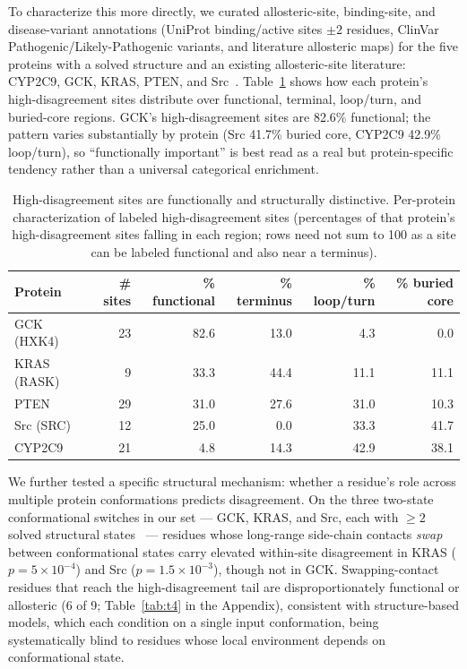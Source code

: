\documentclass{article}
\begin{document}
To characterize this more directly, we curated allosteric-site, binding-site, and disease-variant annotations (UniProt binding/active sites $\pm 2$ residues, ClinVar Pathogenic/Likely-Pathogenic variants, and literature allosteric maps) for the five proteins with a solved structure and an existing allosteric-site literature: CYP2C9, GCK, KRAS, PTEN, and Src~\citep{beltran_allosteric_2026,weng_energetic_2024,liu_insights_2012}. Table~\ref{tab:t1-main} shows how each protein's high-disagreement sites distribute over functional, terminal, loop/turn, and buried-core regions. GCK's high-disagreement sites are 82.6\% functional; the pattern varies substantially by protein (Src 41.7\% buried core, CYP2C9 42.9\% loop/turn), so ``functionally important'' is best read as a real but protein-specific tendency rather than a universal categorical enrichment.

\begin{table}[t]
  \caption{High-disagreement sites are functionally and structurally distinctive. Per-protein characterization of labeled high-disagreement sites (percentages of that protein's high-disagreement sites falling in each region; rows need not sum to 100 as a site can be labeled functional and also near a terminus).}
  \label{tab:t1-main}
  \centering
  \small
  \begin{tabular}{lrrrrr}
    \toprule
    Protein & \# sites & \% functional & \% terminus & \% loop/turn & \% buried core \\
    \midrule
    GCK (HXK4)   & 23 & 82.6 & 13.0 & 4.3  & 0.0  \\
    KRAS (RASK)  & 9  & 33.3 & 44.4 & 11.1 & 11.1 \\
    PTEN         & 29 & 31.0 & 27.6 & 31.0 & 10.3 \\
    Src (SRC)    & 12 & 25.0 & 0.0  & 33.3 & 41.7 \\
    CYP2C9       & 21 & 4.8  & 14.3 & 42.9 & 38.1 \\
    \bottomrule
  \end{tabular}
\end{table}

We further tested a specific structural mechanism: whether a residue's role across multiple protein conformations predicts disagreement. On the three two-state conformational switches in our set --- GCK, KRAS, and Src, each with $\geq 2$ solved structural states~\citep{liu_insights_2012,weng_energetic_2024,beltran_allosteric_2026} --- residues whose long-range side-chain contacts \emph{swap} between conformational states carry elevated within-site disagreement in KRAS ($p=5\times10^{-4}$) and Src ($p=1.5\times10^{-3}$), though not in GCK. Swapping-contact residues that reach the high-disagreement tail are disproportionately functional or allosteric (6 of 9; Table~\ref{tab:t4} in the Appendix), consistent with structure-based models, which each condition on a single input conformation, being systematically blind to residues whose local environment depends on conformational state.
\end{document}
